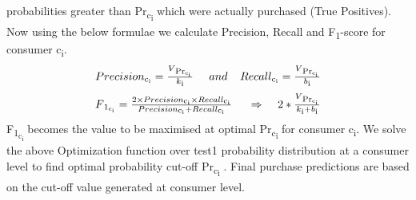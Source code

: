 probabilities greater than Pr\textsubscript{c\textsubscript{i}} which were actually purchased (True Positives). 
Now using the below formulae we calculate Precision, Recall and F\textsubscript{1}-score for consumer c\textsubscript{i}.
  \begin{equation}
    \begin{array}{l}
      Precision\textsubscript{c\textsubscript{i}}= \frac{V\textsubscript{Pr\textsubscript{c\textsubscript{i}}}} {k\textsubscript{i}}
      \;\;\;\;\;and\;\;\;\;
      Recall\textsubscript{c\textsubscript{i}}= \frac{V\textsubscript{Pr\textsubscript{c\textsubscript{i}}}} {b\textsubscript{i}}
    \end{array}
    \label{eqn:F1}
  \end{equation}
  \begin{equation}
    \begin{array}{l}
      F\textsubscript{1\textsubscript{c\textsubscript{i}}} = \frac{2 \times Precision\textsubscript{c\textsubscript{i}} 
      \times Recall\textsubscript{c\textsubscript{i}}} 
      {Precision\textsubscript{c\textsubscript{i}} + Recall\textsubscript{c\textsubscript{i}}}
      \;
      \;\;\;\;\Rightarrow	\;\;\;\;
      2 * 
      \frac{
        V\textsubscript{Pr\textsubscript{c\textsubscript{i}}}
      }
      {
        k\textsubscript{i} + b\textsubscript{i}
      }
    \end{array}
    \label{eqn:Optimizer}
  \end{equation}
F\textsubscript{1\textsubscript{c\textsubscript{i}}} becomes the value to be maximised
at optimal Pr\textsubscript{c\textsubscript{i}} for consumer c\textsubscript{i}.
We solve the above Optimization function over test1 probability distribution 
at a consumer level to find optimal probability cut-off Pr\textsubscript{c\textsubscript{i}} . 
Final purchase predictions are based on the cut-off value generated at consumer level.
